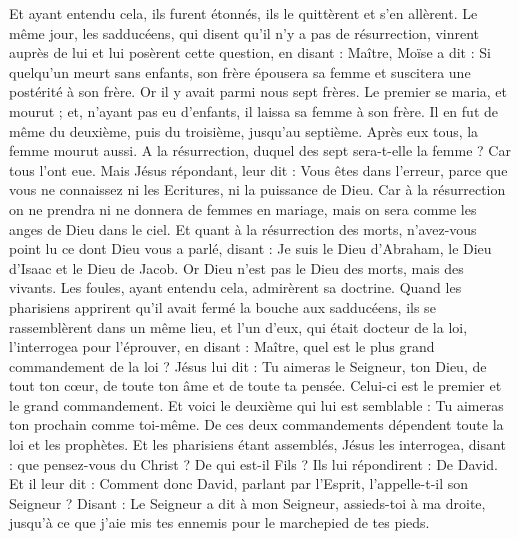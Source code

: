 \begin{multicols}{2}
Et ayant entendu cela, ils furent étonnés, ils le quittèrent et s'en allèrent.
Le même jour, les sadducéens, qui disent qu'il n'y a pas de résurrection, vinrent auprès de lui et lui posèrent cette question,
en disant : Maître, Moïse a dit : Si quelqu'un meurt sans enfants, son frère épousera sa femme et suscitera une postérité à son frère.
Or il y avait parmi nous sept frères. Le premier se maria, et mourut ; et, n'ayant pas eu d'enfants, il laissa sa femme à son frère.
Il en fut de même du deuxième, puis du troisième, jusqu'au septième.
Après eux tous, la femme mourut aussi.
A la résurrection, duquel des sept sera-t-elle la femme ? Car tous l'ont eue.
Mais Jésus répondant, leur dit : Vous êtes dans l'erreur, parce que vous ne connaissez ni les Ecritures, ni la puissance de Dieu.
Car à la résurrection on ne prendra ni ne donnera de femmes en mariage, mais on sera comme les anges de Dieu dans le ciel.
Et quant à la résurrection des morts, n'avez-vous point lu ce dont Dieu vous a parlé, disant :
Je suis le Dieu d'Abraham, le Dieu d'Isaac et le Dieu de Jacob. Or Dieu n'est pas le Dieu des morts, mais des vivants.
Les foules, ayant entendu cela, admirèrent sa doctrine.
Quand les pharisiens apprirent qu'il avait fermé la bouche aux sadducéens, ils se rassemblèrent dans un même lieu,
et l'un d'eux, qui était docteur de la loi, l'interrogea pour l'éprouver, en disant :
Maître, quel est le plus grand commandement de la loi ?
Jésus lui dit : Tu aimeras le Seigneur, ton Dieu, de tout ton cœur, de toute ton âme et de toute ta pensée.
Celui-ci est le premier et le grand commandement.
Et voici le deuxième qui lui est semblable : Tu aimeras ton prochain comme toi-même.
De ces deux commandements dépendent toute la loi et les prophètes.
Et les pharisiens étant assemblés, Jésus les interrogea,
disant : que pensez-vous du Christ ? De qui est-il Fils ? Ils lui répondirent : De David.
Et il leur dit : Comment donc David, parlant par l'Esprit, l'appelle-t-il son Seigneur ? Disant :
Le Seigneur a dit à mon Seigneur, assieds-toi à ma droite, jusqu'à ce que j'aie mis tes ennemis pour le marchepied de tes pieds.

\end{multicols}
